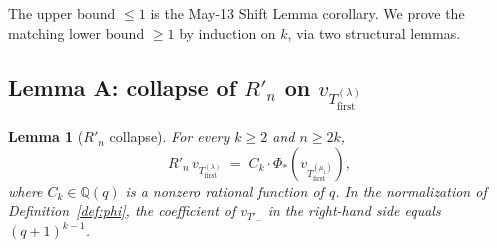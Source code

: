 \documentclass[11pt]{article}
\newtheorem{lemma}[theorem]{Lemma}
\theoremstyle{definition}
\begin{document}
The upper bound $\le 1$ is the May-13 Shift Lemma corollary.  We prove
the matching lower bound $\ge 1$ by induction on $k$, via two
structural lemmas.

\subsection{Lemma A: collapse of $R'_n$ on $v_{T_{\mathrm{first}}^{(\lambda)}}$}

\begin{lemma}[$R'_n$ collapse]\label{lem:Rn-collapse}
For every $k \ge 2$ and $n \ge 2k$,
\begin{equation}\label{eq:Rn-collapse}
    R'_n\,v_{T_{\mathrm{first}}^{(\lambda)}}
    \;=\;
    C_k \cdot \Phi_*\!\left(v_{T_{\mathrm{first}}^{(\mu_1)}}\right),
\end{equation}
where $C_k \in \mathbb{Q}(q)$ is a nonzero rational function of $q$.
In the normalization of Definition~\ref{def:phi}, the coefficient of
$v_{T'_-}$ in the right-hand side equals $(q+1)^{k-1}$.
\end{lemma}
\end{document}
